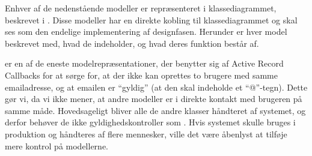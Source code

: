 Enhver af de nedenstående modeller er repræsenteret i klassediagrammet, beskrevet i . Disse modeller har en direkte kobling til klassediagrammet og skal ses som den endelige implementering af designfasen. Herunder er hver model beskrevet med, hvad de indeholder, og hvad deres funktion består af.

 er en af de eneste modelrepræsentationer, der benytter sig af Active Record Callbacks for at sørge for, at der \fx ikke kan oprettes to brugere med samme emailadresse, og at emailen er ``gyldig'' (\fx at den skal indeholde et ``@''-tegn). Dette gør vi, da vi ikke mener, at andre modeller er i direkte kontakt med brugeren på samme måde. Hovedsageligt bliver alle de andre klasser håndteret af systemet, og derfor behøver de \fx ikke gyldighedskontroller som . Hvis systemet skulle bruges i produktion og håndteres af flere mennesker, ville det være åbenlyst at tilføje mere kontrol på modellerne.


